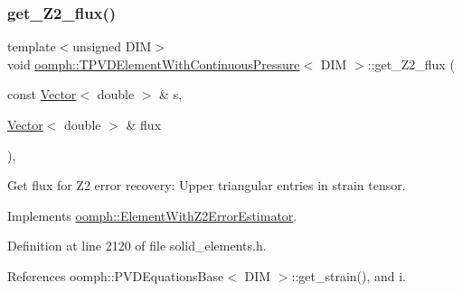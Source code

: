 \mbox{\label{classoomph_1_1TPVDElementWithContinuousPressure_ad86fa95c068d3ae0735729e42f5fe3c1}} 
\subsubsection{\texorpdfstring{get\+\_\+\+Z2\+\_\+flux()}{get\_Z2\_flux()}}
{\footnotesize\ttfamily template$<$unsigned D\+IM$>$ \\
void \hyperlink{classoomph_1_1TPVDElementWithContinuousPressure}{oomph\+::\+T\+P\+V\+D\+Element\+With\+Continuous\+Pressure}$<$ D\+IM $>$\+::get\+\_\+\+Z2\+\_\+flux (\begin{DoxyParamCaption}\item[{const \hyperlink{classoomph_1_1Vector}{Vector}$<$ double $>$ \&}]{s,  }\item[{\hyperlink{classoomph_1_1Vector}{Vector}$<$ double $>$ \&}]{flux }\end{DoxyParamCaption})\hspace{0.3cm}{\ttfamily [inline]}, {\ttfamily [virtual]}}



Get \textquotesingle{}flux\textquotesingle{} for Z2 error recovery\+: Upper triangular entries in strain tensor. 



Implements \hyperlink{classoomph_1_1ElementWithZ2ErrorEstimator_a5688ff5f546d81771cabad82ca5a7556}{oomph\+::\+Element\+With\+Z2\+Error\+Estimator}.



Definition at line 2120 of file solid\+\_\+elements.\+h.



References oomph\+::\+P\+V\+D\+Equations\+Base$<$ D\+I\+M $>$\+::get\+\_\+strain(), and i.

\mbox{\label{classoomph_1_1TPVDElementWithContinuousPressure_a6d6c3ea35d168d12901c7b03b5083b62}} 
